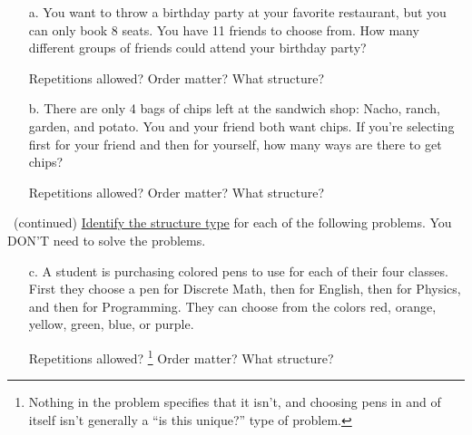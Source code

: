 {\begin{questionNOGRADE}{\thequestion}
        \begin{enumerate}
            \item[a.]   You want to throw a birthday party at your favorite restaurant,
                        but you can only book 8 seats. You have 11 friends to choose from.
                        How many different groups of friends could attend your birthday party?
                        \begin{center}
                            Repetitions allowed? \tab Order matter? \tab What structure?
                        \end{center}
                        
            \item[b.]   There are only 4 bags of chips left at the sandwich shop:
                        Nacho, ranch, garden, and potato. You and your friend both
                        want chips. If you're selecting first for your friend
                        and then for yourself, how many ways are there to get chips?
                        \begin{center}
                            Repetitions allowed? \tab Order matter? \tab What structure?
                        \end{center}
        \end{enumerate}
    \end{questionNOGRADE}

    \begin{questionNOGRADE}{\thequestion\ (continued)}
        \underline{Identify the structure type} for each of the following problems.
        You DON'T need to solve the problems.

        \begin{enumerate}
            \item[c.]   A student is purchasing colored pens to use for each of their four classes.
                        First they choose a pen for Discrete Math, then for English, then for
                        Physics, and then for Programming. They can choose from the colors
                        red, orange, yellow, green, blue, or purple.
                        \begin{center}
                            Repetitions allowed? \footnote{Nothing in the problem specifies that it isn't, and choosing pens in and of itself isn't generally a ``is this unique?'' type of problem.}
                            \tab Order matter? \tab What structure?
                        \end{center}
                        

\end{enumerate}
\end{questionNOGRADE}}
